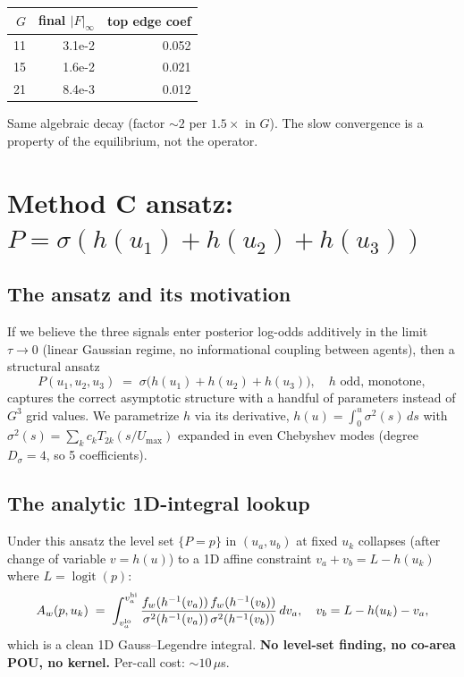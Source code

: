 \documentclass[11pt]{article}
\begin{document}
\begin{center}\begin{tabular}{rrr}\toprule
$G$ & final $|F|_\infty$ & top edge coef \\
\midrule
11 & 3.1e-2 & 0.052 \\
15 & 1.6e-2 & 0.021 \\
21 & 8.4e-3 & 0.012 \\
\bottomrule\end{tabular}\end{center}

Same algebraic decay (factor $\sim 2$ per $1.5{\times}$ in $G$). The
slow convergence is a property of the equilibrium, not the operator.

\section{Method C ansatz: $P = \sigma(h(u_1) + h(u_2) + h(u_3))$}
\label{sec:methodc}

\subsection{The ansatz and its motivation}

If we believe the three signals enter posterior log-odds additively in
the limit $\tau \to 0$ (linear Gaussian regime, no informational
coupling between agents), then a structural ansatz
\[
  P(u_1, u_2, u_3) \;=\; \sigma\bigl(h(u_1) + h(u_2) + h(u_3)\bigr),
  \quad
  h \text{ odd, monotone},
\]
captures the correct asymptotic structure with a handful of parameters
instead of $G^3$ grid values. We parametrize $h$ via its derivative,
$h(u) = \int_0^u \sigma^2(s)\, ds$ with $\sigma^2(s) = \sum_k c_k T_{2k}(s/U_{\max})$
expanded in even Chebyshev modes (degree $D_\sigma = 4$, so 5 coefficients).

\subsection{The analytic 1D-integral lookup}

Under this ansatz the level set $\{P = p\}$ in $(u_a, u_b)$ at fixed
$u_k$ collapses (after change of variable $v = h(u)$) to a 1D affine
constraint $v_a + v_b = L - h(u_k)$ where $L = \operatorname{logit}(p)$:
\[
  A_w(p, u_k) \;=\; \int_{v_a^{\rm lo}}^{v_a^{\rm hi}}
  \frac{f_w(h^{-1}(v_a))\, f_w(h^{-1}(v_b))}{\sigma^2(h^{-1}(v_a))\, \sigma^2(h^{-1}(v_b))}\, dv_a,
  \quad v_b = L - h(u_k) - v_a,
\]
which is a clean 1D Gauss--Legendre integral. \textbf{No level-set finding,
no co-area POU, no kernel.} Per-call cost: $\sim 10\,\mu$s.
\end{document}

